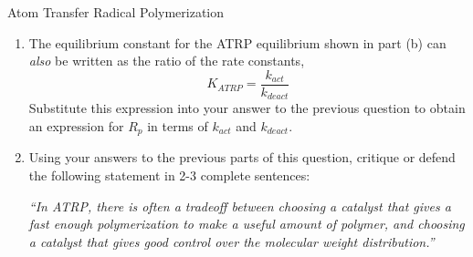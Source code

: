 \begin{activity}{Atom Transfer Radical Polymerization}
\begin{exercises}
\begin{enumerate}
				Use this information, and appropriate information from Activity 4.\ref{FRPkinetics}, to write an equation for the overall polymerization rate $R_p$ in terms of $K_{ATRP}$, $k_p$, and the concentrations of any relevant chemical species.
		
		\begin{solution}\end{solution}
				
			\item The equilibrium constant for the ATRP equilibrium shown in part (b) can \emph{also} be written as the ratio of the rate constants,
				\begin{equation*}
					K_{ATRP} = \frac{k_{act}}{k_{deact}}
				\end{equation*}
				Substitute this expression into your answer to the previous question to obtain an expression for $R_p$ in terms of $k_{act}$ and $k_{deact}$.
		
		\begin{solution}\end{solution}
				
			\item Using your answers to the previous parts of this question, critique or defend the following statement in 2-3 complete sentences:
			
				\emph{``In ATRP, there is often a tradeoff between choosing a catalyst that gives a fast enough polymerization to make a useful amount of polymer, and choosing a catalyst that gives good control over the molecular weight distribution.''}
		

\end{enumerate}
\end{exercises}
\end{activity}
